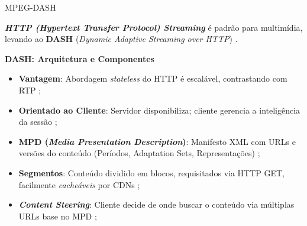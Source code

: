 \documentclass[10pt]{beamer}
\begin{document}

\begin{frame}{MPEG-DASH}

\textbf{\textit{HTTP (Hypertext Transfer Protocol) Streaming}} é padrão para multimídia, levando ao \textbf{DASH} (\textit{Dynamic Adaptive Streaming over HTTP}) \cite{thang2012adaptive}.

\textbf{DASH: Arquitetura e Componentes}
\begin{itemize}
    \item \textbf{Vantagem}: Abordagem \textit{stateless} do HTTP é escalável, contrastando com RTP \cite{sodagar2011mpegdash};
    \item \textbf{Orientado ao Cliente}: Servidor disponibiliza; cliente gerencia a inteligência da sessão \cite{stockhammer2011dynamic};
    \item \textbf{MPD (\textit{Media Presentation Description})}: Manifesto XML com URLs e versões do conteúdo (Períodos, Adaptation Sets, Representações) \cite{sodagar2011mpegdash};
    \item \textbf{Segmentos}: Conteúdo dividido em blocos, requisitados via HTTP GET, facilmente \textit{cacheáveis} por CDNs \cite{stockhammer2011dynamic};
    \item \textbf{\textit{Content Steering}}: Cliente decide de onde buscar o conteúdo via múltiplas URLs base no MPD \cite{sodagar2011mpegdash};
\end{itemize}
\end{frame}





\end{document}
